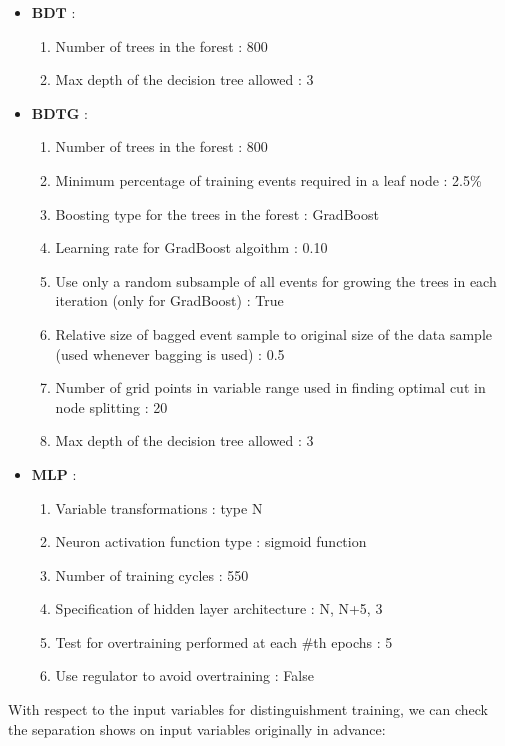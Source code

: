 			\begin{itemize}

				\item $\textbf{BDT}$ :
				\begin{enumerate}
					\item Number of trees in the forest : 800
					\item Max depth of the decision tree allowed : 3
				\end{enumerate}
				\item $\textbf{BDTG}$ :
				\begin{enumerate}
					\item Number of trees in the forest : 800
					\item Minimum percentage of training events required in a leaf node : 2.5\%
					\item Boosting type for the trees in the forest : GradBoost
					\item Learning rate for GradBoost algoithm : 0.10
					\item Use only a random subsample of all events for growing the trees in each iteration (only for GradBoost) : True
					\item Relative size of bagged event sample to original size of the data sample (used whenever bagging is used) : 0.5
					\item Number of grid points in variable range used in finding optimal cut in node splitting : 20
					\item Max depth of the decision tree allowed : 3
				\end{enumerate}
				\item $\textbf{MLP}$ :
				\begin{enumerate}
					\item Variable transformations : type N
					\item Neuron activation function type : sigmoid function
					\item Number of training cycles : 550
					\item Specification of hidden layer architecture : N, N+5, 3
					\item Test for overtraining performed at each $\#$th epochs : 5
					\item Use regulator to avoid overtraining : False
				\end{enumerate}
			\end{itemize}

			With respect to the input variables for distinguishment training, we can check the separation shows on input variables originally in advance:

